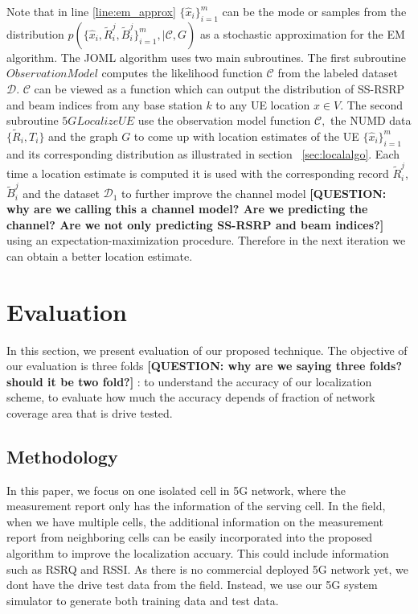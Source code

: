 \documentclass[conference, 10pt]{IEEEtran}
\begin{document}
Note that in line \ref{line:em_approx} $\{\hat{x}_i\}_{i=1}^m$ can be the mode
or samples from the distribution
$p(\{\hat{x}_i,\tilde{R}^j_i, \tilde{B}^j_i\}_{i=1}^m,|\mathcal{C},G)$ as a stochastic
approximation for the EM algorithm. The JOML algorithm uses two main
subroutines. The first subroutine $ObservationModel$ computes the likelihood function
$\mathcal{C}$ from the labeled dataset $\mathcal{D}.$ $\mathcal{C}$ can be
viewed as a function which can output the distribution of SS-RSRP and beam indices from any base
station $k$ to any UE location $x \in V.$ The second subroutine $5GLocalizeUE$
use the observation model function $\mathcal{C},$ the NUMD data
$\{\tilde{R}_i,T_i\}$ and the graph $G$ to come up with location estimates of
the UE $\{\hat{x}_i\}_{i=1}^m$ and its corresponding distribution as illustrated in section ~\ref{sec:localalgo}. Each time a
location estimate is computed it is used with the corresponding record
$\tilde{R}^j_i$, $\tilde{B}^j_i$ and the dataset $\mathcal{D}_1$ to further improve the channel
model \textbf{[QUESTION: why are we calling this a channel model? Are we predicting the channel? Are we not only predicting SS-RSRP and beam indices?] } using an expectation-maximization procedure. Therefore in the next
iteration we can obtain a better location estimate. 


\section{Evaluation}
\label{sec:eval}

In this section, we present evaluation of our proposed technique. The objective of
our evaluation is three folds \textbf{[QUESTION: why are we saying three folds? should it be two fold?] } : to understand the accuracy of our localization scheme, to evaluate
how much the accuracy depends of fraction of network coverage area that is drive
tested.

\subsection{Methodology}
In this paper, we focus on one isolated cell in 5G network, where the measurement report
only has the information of the serving cell. In the field, when we have multiple cells, the additional
information on the measurement report from neighboring cells can be easily incorporated into the proposed algorithm to improve the 
localization accuary. This could include information such as RSRQ and RSSI. As there is no commercial deployed 5G network yet, we dont have the drive test data from the field.
Instead, we use our 5G system simulator to generate both training data and test data.
\end{document}
